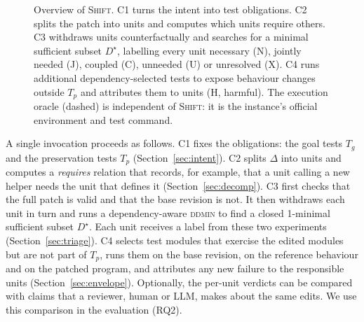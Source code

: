 \documentclass[a4paper,fleqn]{cas-sc}
\newcommand{\tool}{\textsc{Shift}}
\newcommand{\lab}[1]{\textsf{#1}}
\begin{document}
\begin{figure}[pos=htbp]
{}
\caption{Overview of \tool{}. C1 turns the intent into test obligations. C2 splits the patch into units and computes which units require others. C3 withdraws units counterfactually and searches for a minimal sufficient subset $D^\star$, labelling every unit necessary (\lab{N}), jointly needed (\lab{J}), coupled (\lab{C}), unneeded (\lab{U}) or unresolved (\lab{X}). C4 runs additional dependency-selected tests to expose behaviour changes outside $T_p$ and attributes them to units (\lab{H}, harmful). The execution oracle (dashed) is independent of \tool{}: it is the instance's official environment and test command.}
\label{fig:overview}
\end{figure}

A single invocation proceeds as follows. C1 fixes the obligations: the goal tests $T_g$ and the preservation tests $T_p$ (Section~\ref{sec:intent}). C2 splits $\Delta$ into units and computes a \emph{requires} relation that records, for example, that a unit calling a new helper needs the unit that defines it (Section~\ref{sec:decomp}). C3 first checks that the full patch is valid and that the base revision is not. It then withdraws each unit in turn and runs a dependency-aware \textsc{ddmin} to find a closed 1-minimal sufficient subset $D^\star$. Each unit receives a label from these two experiments (Section~\ref{sec:triage}). C4 selects test modules that exercise the edited modules but are not part of $T_p$, runs them on the base revision, on the reference behaviour and on the patched program, and attributes any new failure to the responsible units (Section~\ref{sec:envelope}). Optionally, the per-unit verdicts can be compared with claims that a reviewer, human or LLM, makes about the same edits. We use this comparison in the evaluation (RQ2).
\end{document}
